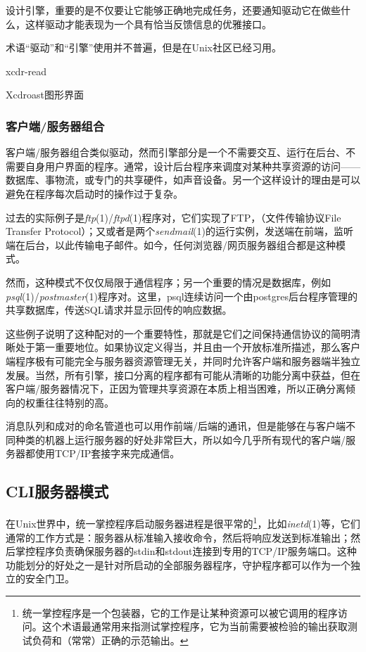 \documentclass[12pt,oneside]{ctexbook}
\begin{document}
\begin{common-format}
设计引擎，重要的是不仅要让它能够正确地完成任务，还要通知驱动它在做些什么，这样驱动才能表现为一个具有恰当反馈信息的优雅接口。

术语“驱动”和“引擎”使用并不普遍，但是在Unix社区已经习用。

\begin{linefig}[0.9]{xcdr-read}
\caption{Xcdroast图形界面}
\label{fig:xcdr-read}
\end{linefig}

\subsubsection{客户端/服务器组合}
客户端/服务器组合类似驱动，然而引擎部分是一个不需要交互、运行在后台、不需要自身用户界面的程序。通常，设计后台程序来调度对某种共享资源的访问——数据库、事物流，或专门的共享硬件，如声音设备。另一个这样设计的理由是可以避免在程序每次启动时的操作过于复杂。

过去的实际例子是\textit{ftp}(1)/\textit{ftpd}(1)程序对，它们实现了FTP，（文件传输协议File Transfer Protocol）；又或者是两个\textit{sendmail}(1)的运行实例，发送端在前端，监听端在后台，以此传输电子邮件。如今，任何浏览器/网页服务器组合都是这种模式。

然而，这种模式不仅仅局限于通信程序；另一个重要的情况是数据库，例如\textit{psql}(1)/\textit{postmaster}(1)程序对。这里，psql连续访问一个由postgres后台程序管理的共享数据库，传送SQL请求并显示回传的响应数据。

这些例子说明了这种配对的一个重要特性，那就是它们之间保持通信协议的简明清晰处于第一重要地位。如果协议定义得当，并且由一个开放标准所描述，那么客户端程序极有可能完全与服务器资源管理无关，并同时允许客户端和服务器端半独立发展。当然，所有引擎，接口分离的程序都有可能从清晰的功能分离中获益，但在客户端/服务器情况下，正因为管理共享资源在本质上相当困难，所以正确分离倾向的权重往往特别的高。

消息队列和成对的命名管道也可以用作前端/后端的通讯，但是能够在与客户端不同种类的机器上运行服务器的好处非常巨大，所以如今几乎所有现代的客户端/服务器都使用TCP/IP套接字来完成通信。

\subsection{CLI服务器模式}
在Unix世界中，统一掌控程序启动服务器进程是很平常的\footnote{统一掌控程序是一个包装器，它的工作是让某种资源可以被它调用的程序访问。这个术语最通常用来指测试掌控程序，它为当前需要被检验的输出获取测试负荷和（常常）正确的示范输出。}，比如\textit{inetd}(1)等，它们通常的工作方式是：服务器从标准输入接收命令，然后将响应发送到标准输出；然后掌控程序负责确保服务器的stdin和stdout连接到专用的TCP/IP服务端口。这种功能划分的好处之一是针对所启动的全部服务器程序，守护程序都可以作为一个独立的安全门卫。


\end{common-format}
\end{document}
